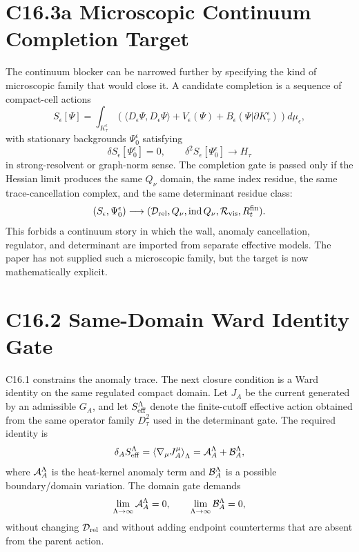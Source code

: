 \documentclass[11pt]{article}
\begin{document}
\section{C16.3a Microscopic Continuum Completion Target}
The continuum blocker can be narrowed further by specifying the kind of
microscopic family that would close it.  A candidate completion is a sequence
of compact-cell actions
\begin{equation}
S_\epsilon[\Psi]
=
\int_{K_\tau^\epsilon}
\left(
\langle D_\epsilon\Psi,D_\epsilon\Psi\rangle
 +V_\epsilon(\Psi)
 +B_\epsilon(\Psi|\partial K_\tau^\epsilon)
\right)d\mu_\epsilon ,
\end{equation}
with stationary backgrounds $\Psi_0^\epsilon$ satisfying
\begin{equation}
\delta S_\epsilon[\Psi_0^\epsilon]=0,
\qquad
\delta^2S_\epsilon[\Psi_0^\epsilon]
\longrightarrow
H_\tau
\end{equation}
in strong-resolvent or graph-norm sense.  The completion gate is passed only if
the Hessian limit produces the same $Q_\nu$ domain, the same index residue, the
same trace-cancellation complex, and the same determinant residue class:
\begin{equation}
(S_\epsilon,\Psi_0^\epsilon)
\longrightarrow
({\cal D}_{\rm rel},Q_\nu,\operatorname{ind}Q_\nu,
{\cal R}_{\rm vis},R_t^{\rm fin}).
\end{equation}
This forbids a continuum story in which the wall, anomaly cancellation,
regulator, and determinant are imported from separate effective models.  The
paper has not supplied such a microscopic family, but the target is now
mathematically explicit.

\section{C16.2 Same-Domain Ward Identity Gate}
C16.1 constrains the anomaly trace.  The next closure condition is a Ward
identity on the same regulated compact domain.  Let $J_A$ be the current
generated by an admissible $G_A$, and let $S_{\rm eff}^\Lambda$ denote the
finite-cutoff effective action obtained from the same operator family
$D_\tau^2$ used in the determinant gate.  The required identity is
\begin{equation}
\delta_A S_{\rm eff}^\Lambda
=
\left\langle\nabla_\mu J_A^\mu\right\rangle_\Lambda
=
{\cal A}_A^\Lambda
+{\cal B}_A^\Lambda ,
\end{equation}
where ${\cal A}_A^\Lambda$ is the heat-kernel anomaly term and
${\cal B}_A^\Lambda$ is a possible boundary/domain variation.  The domain
gate demands
\begin{equation}
\lim_{\Lambda\to\infty}{\cal A}_A^\Lambda=0,
\qquad
\lim_{\Lambda\to\infty}{\cal B}_A^\Lambda=0,
\end{equation}
without changing $\mathcal D_{\rm rel}$ and without adding endpoint
counterterms that are absent from the parent action.
\end{document}
